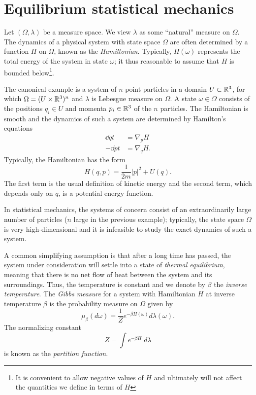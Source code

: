 
\section{Equilibrium statistical mechanics}
\label{sec:gibbs}

Let $(\Omega, \lambda)$ be a measure space. We view $\lambda$ as some ``natural''
measure on $\Omega$. The dynamics of a physical system with state space $\Omega$
are often determined by a function $H$ on $\Omega$, known as the \emph{Hamiltonian}.
Typically, $H(\omega)$ represents the total energy of the system in state $\omega$;
it thus reasonable to assume that $H$ is bounded below\footnote{It is convenient
to allow negative values of $H$ and ultimately will not affect the quantities we
define in terms of $H$}.

\begin{example}
\label{ex:hamilton}
The canonical example is a system of $n$ point particles in a domain $U \subset {\mathbb R}^3$,
for which $\Omega = (U \times {\mathbb R}^3)^n$ and $\lambda$ is Lebesgue measure on $\Omega$.
A state $\omega\in\Omega$ consists of the positions $q_i \in U$ and momenta $p_i \in {\mathbb R}^3$
of the $n$ particles. The Hamiltonian is smooth and the dynamics of such a system
are determined by Hamilton's equations
\begin{align}
\dd{q}{t} 	&= \nabla_p H \\
-\dd{p}{t} 	&= \nabla_q H.
\end{align}
Typically, the Hamiltonian has the form
\begin{equation}
\label{e:total-energy}
H(q, p) = \frac{1}{2m} |p|^2 + U(q).
\end{equation}
The first term is the usual definition of kinetic energy and the second term, which
depends only on $q$, is a potential energy function.
\end{example}

In statistical mechanics, the systems of concern consist of an extraordinarily large number
of particles ($n$ large in the previous example); typically, the state space $\Omega$ is very
high-dimensional and it is infeasible to study the exact dynamics of such a system.

A common simplifying assumption is that after a long time has passed, the system
under consideration will settle into a state of \emph{thermal equilibrium}, meaning
that there is no net flow of heat between the system and its surroundings. Thus,
the temperature is constant and we denote by $\beta$ the \emph{inverse temperature}.
The \emph{Gibbs measure} \cite{Gibbs60} for a system with Hamiltonian $H$ at inverse temperature
$\beta$ is the probability measure on $\Omega$ given by
\begin{equation}
\label{e:gibbs-def}
\mu_\beta(d\omega) = \frac{1}{Z} e^{-\beta H(\omega)} d\lambda(\omega).
\end{equation}
The normalizing constant
\begin{equation}
Z = \int e^{-\beta H} \; d\lambda
\end{equation}
is known as the \emph{partition function}.

